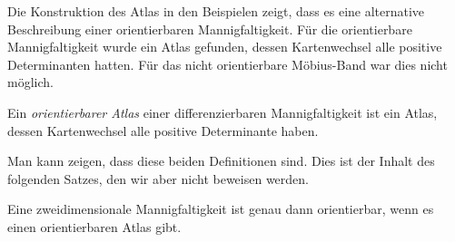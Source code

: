 Die Konstruktion des Atlas in den Beispielen zeigt, dass es eine
alternative Beschreibung einer orientierbaren Mannigfaltigkeit.
Für die orientierbare Mannigfaltigkeit wurde ein Atlas gefunden,
dessen Kartenwechsel alle positive Determinanten hatten.
Für das nicht orientierbare Möbius-Band war dies nicht möglich.

\begin{definition}
Ein \emph{orientierbarer Atlas} einer differenzierbaren Mannigfaltigkeit
%
ist ein Atlas, dessen Kartenwechsel alle positive Determinante haben.
%
\end{definition}

Man kann zeigen, dass diese beiden Definitionen sind.
Dies ist der Inhalt des folgenden Satzes, den wir aber nicht
beweisen werden.

\begin{satz}
Eine zweidimensionale Mannigfaltigkeit ist genau dann orientierbar,
wenn es einen orientierbaren Atlas gibt.
\end{satz}



